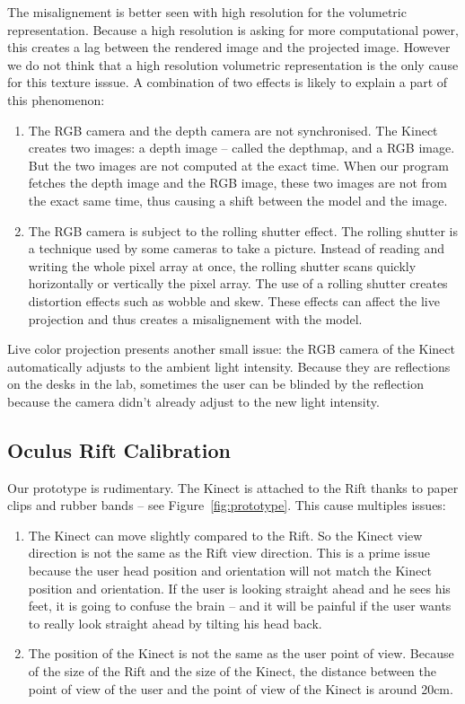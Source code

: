 \documentclass[12pt, twoside]{article}
\begin{document}
The misalignement is better seen with high resolution for the volumetric representation. Because a high resolution is asking for more computational power, this creates a lag between the rendered image and the projected image. However we do not think that a high resolution volumetric representation is the only cause for this texture isssue. A combination of two effects is likely to explain a part of this phenomenon:
\begin{enumerate}
\item The RGB camera and the depth camera are not synchronised. The Kinect creates two images: a depth image -- called the depthmap, and a RGB image. But the two images are not computed at the exact time. When our program fetches the depth image and the RGB image, these two images are not from the exact same time, thus causing a shift between the model and the image.
\item The RGB camera is subject to the rolling shutter effect. The rolling shutter is a technique used by some cameras to take a picture. Instead of reading and writing the whole pixel array at once, the rolling shutter scans quickly horizontally or vertically the pixel array. The use of a rolling shutter creates distortion effects such as wobble and skew. These effects can affect the live projection and thus creates a misalignement with the model.
\end{enumerate}

Live color projection presents another small issue: the RGB camera of the Kinect automatically adjusts to the ambient light intensity. Because they are reflections on the desks in the lab, sometimes the user can be blinded by the reflection because the camera didn't already adjust to the new light intensity.

\subsection{Oculus Rift Calibration}

Our prototype is rudimentary. The Kinect is attached to the Rift thanks to paper clips and rubber bands -- see Figure~\ref{fig:prototype}. This cause multiples issues:
\begin{enumerate}
\item The Kinect can move slightly compared to the Rift. So the Kinect view direction is not the same as the Rift view direction. This is a prime issue because the user head position and orientation will not match the Kinect position and orientation. If the user is looking straight ahead and he sees his feet, it is going to confuse the brain -- and it will be painful if the user wants to really look straight ahead by tilting his head back.
\item The position of the Kinect is not the same as the user point of view. Because of the size of the Rift and the size of the Kinect, the distance between the point of view of the user and the point of view of the Kinect is around 20cm.
\end{enumerate}
\end{document}
